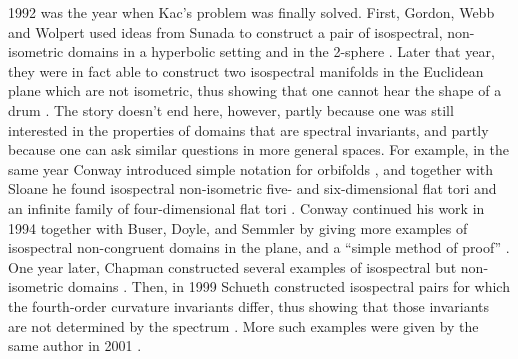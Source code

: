 \documentclass{amsart}
\theoremstyle{definition}
\begin{document}
1992 was the year when Kac's problem was finally solved. First, Gordon, Webb and Wolpert used ideas from Sunada to construct a pair of isospectral, non-isometric domains in a hyperbolic setting and in the 2-sphere \cite{gordon1992isospectral}. Later that year, they were in fact able to construct two isospectral manifolds in the Euclidean plane which are not isometric, thus showing that one cannot hear the shape of a drum \cite{gordon1992one}. The story doesn't end here, however, partly because one was still interested in the properties of domains that are spectral invariants, and partly because one can ask similar questions in more general spaces. For example, in the same year Conway introduced simple notation for orbifolds \cite{conway1992orbifold}, and together with Sloane he found isospectral non-isometric five- and six-dimensional flat tori and an infinite family of four-dimensional flat tori \cite{conway1992four}. Conway continued his work in 1994 together with Buser, Doyle, and Semmler by giving more examples of isospectral non-congruent domains in the plane, and a ``simple method of proof'' \cite{buser1994some}. One year later, Chapman constructed several examples of isospectral but non-isometric domains \cite{chapman1995drums}. Then, in 1999 Schueth constructed isospectral pairs for which the fourth-order curvature invariants differ, thus showing that those invariants are not determined by the spectrum \cite{schueth1999continuous}. More such examples were given by the same author in 2001 \cite{schueth2001isospectral}.
\end{document}
